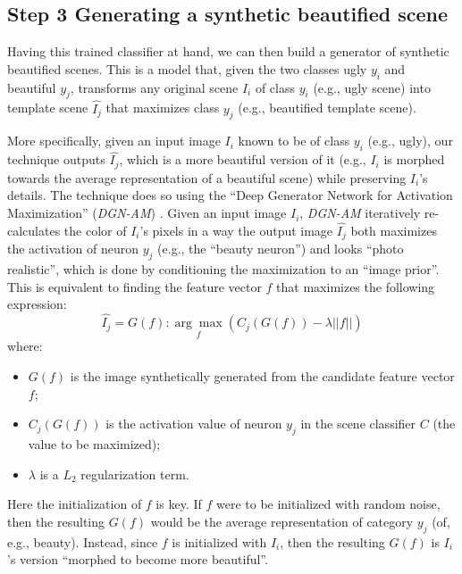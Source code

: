 \subsection*{Step 3 Generating a synthetic beautified scene}
Having this trained classifier at hand, we can then build a generator of synthetic beautified scenes. This is a model that, given the two classes ugly $y_i$ and beautiful $y_j$, transforms any original scene $I_i$ of class $y_i$ (e.g., ugly scene) into template scene $\hat{I_j}$ that maximizes class $y_j$ (e.g., beautified template scene). 

More specifically, given an input image $I_i$ known to be of class $y_i$  (e.g., ugly), our technique outputs  $\hat{I_j}$, which is a more beautiful version of it (e.g., $I_i$ is morphed  towards the average representation of a beautiful scene) while preserving $I_i$'s details. The technique does so using the ``Deep Generator Network for Activation Maximization'' (\emph{DGN-AM}) \cite{nguyen2016synthesizing}. Given an input image $I_i$, \emph{DGN-AM} iteratively re-calculates the color of $I_i$'s pixels in  a way  the output image $\hat{I_j}$  both maximizes  the  activation of neuron $y_j$ (e.g., the ``beauty neuron'') and looks ``photo realistic'',  which is done by conditioning the maximization to an ``image prior''. This is equivalent to finding the feature vector $f$ that maximizes the following expression:
\begin{equation}
\hat{I_j} =G( f ) : \underset{f}{\arg\max}(C_{j}(G(f))-\lambda||f||)
\end{equation}
where:
\begin{itemize}
    \item $G(f)$ is the image synthetically generated from the candidate feature vector $f$;
    \item $C_j(G(f))$ is the activation value of neuron $y_j$ in the scene classifier $C$ (the value to be maximized);
    \item $\lambda$ is a $L_2$ regularization term.
\end{itemize}
Here the initialization of $f$ is key. If $f$ were to be initialized with random noise, then the resulting $G(f)$ would be the average representation of category $y_j$ (of, e.g., beauty). Instead, since $f$ is initialized with $I_i$, then the resulting $G(f)$ is $I_i$'s version ``morphed to become more beautiful''. 

